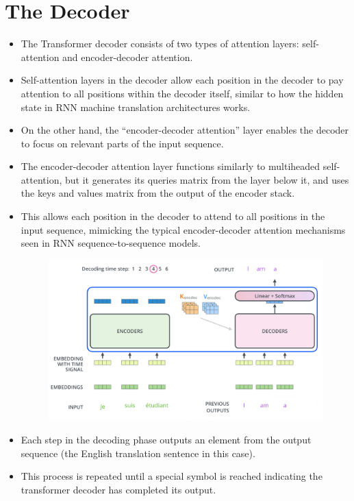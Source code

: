 \section{The Decoder}
\begin{itemize}
\item The Transformer decoder consists of two types of attention layers: self-attention and encoder-decoder attention.

\item Self-attention layers in the decoder allow each position in the decoder to pay attention to all positions within the decoder itself, similar to how the hidden state in RNN machine translation architectures works.

\item On the other hand, the ``encoder-decoder attention'' layer enables the decoder to focus on relevant parts of the input sequence.

\item The encoder-decoder attention layer functions similarly to multiheaded self-attention, but it generates its queries matrix from the layer below it, and uses the keys and values matrix from the output of the encoder stack.

\item This allows each position in the decoder to attend to all positions in the input sequence, mimicking the typical encoder-decoder attention mechanisms seen in RNN sequence-to-sequence models.



     \begin{figure}[h]
        	\includegraphics[scale = 0.28]{pics/transformer_decoder.png}
        \end{figure}  
 \item Each step in the decoding phase outputs an element from the output sequence (the English translation sentence in this case). 
 \item This process is repeated until a special symbol is reached indicating the transformer decoder has completed its output.
 

\end{itemize}
